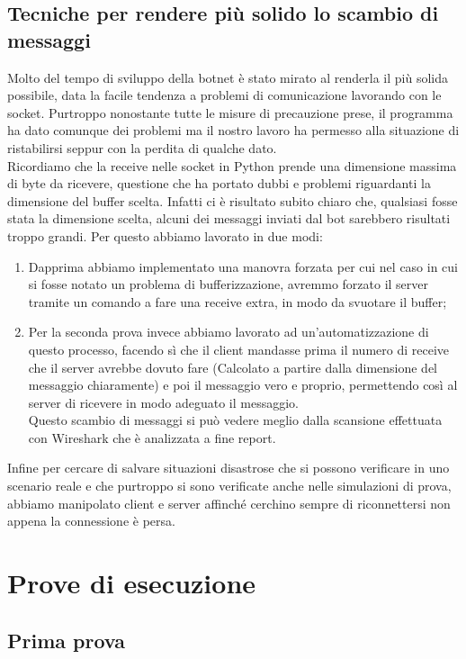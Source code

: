 \documentclass[a4paper]{report}
\begin{document}
\section{Tecniche per rendere più solido lo scambio di messaggi}
Molto del tempo di sviluppo della botnet è stato mirato al renderla il più solida possibile, data la facile tendenza a problemi di comunicazione lavorando con le socket.
Purtroppo nonostante tutte le misure di precauzione prese, il programma ha dato comunque dei problemi ma il nostro lavoro ha permesso alla situazione di ristabilirsi seppur con la perdita di qualche dato.\\
Ricordiamo che la receive nelle socket in Python prende una dimensione massima di byte da ricevere, questione che ha portato dubbi e problemi riguardanti la dimensione del buffer scelta. Infatti ci è risultato subito chiaro che, qualsiasi fosse stata la dimensione scelta, alcuni dei messaggi inviati dal bot sarebbero risultati troppo grandi. Per questo abbiamo lavorato in due modi:
\begin{enumerate}
	\item Dapprima abbiamo implementato una manovra forzata per cui nel caso in cui si fosse notato un problema di bufferizzazione, avremmo forzato il server tramite un comando a fare una receive extra, in modo da svuotare il buffer;
	\item Per la seconda prova invece abbiamo lavorato ad un'automatizzazione di questo processo, facendo sì che il client mandasse prima il numero di receive che il server avrebbe dovuto fare (Calcolato a partire dalla dimensione del messaggio chiaramente) e poi il messaggio vero e proprio, permettendo così al server di ricevere in modo adeguato il messaggio.\\
	Questo scambio di messaggi si può vedere meglio dalla scansione effettuata con Wireshark che è analizzata a fine report.
\end{enumerate}
Infine per cercare di salvare situazioni disastrose che si possono verificare in uno scenario reale e che purtroppo si sono verificate anche nelle simulazioni di prova, abbiamo manipolato client e server affinché cerchino sempre di riconnettersi non appena la connessione è persa.

\chapter{Prove di esecuzione}

\section{Prima prova}
\end{document}
